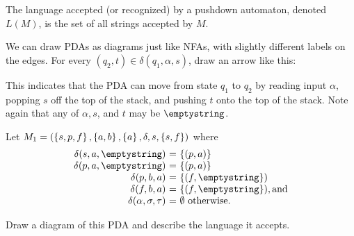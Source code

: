 \documentclass[twoside,letterpaper,openany]{book}
\begin{document}
\begin{defn}
The language accepted (or recognized) by a pushdown automaton, denoted $L(M)$, is the set of all strings accepted by $M$.

\end{defn}

\begin{discussion}
We can draw PDAs as diagrams just like NFAs, with slightly different labels on the edges. For every $(q_2, t) \in \delta(q_1, \alpha, s)$,   draw an arrow like this: 

\begin{center}
\end{center}

This indicates that the PDA can move from state $q_1$ to $q_2$ by reading input $\alpha$, popping $s$ off the top of the stack, and pushing $t$ onto the top of the stack. Note again that any of $\alpha, s$, and $t$ may be $\emptystring$.
\end{discussion}

\begin{exer}
Let $M_1 = (\left\lbrace s, p, f \right\rbrace, \left\lbrace a, b \right\rbrace, \left\lbrace a \right\rbrace, \delta, s, \left\lbrace s, f \right\rbrace)$ where 
\[\begin{array}{r@{\ =\ }l}
\delta(s, a, \emptystring)  &  \setdef{(p, a)}  \\
\delta(p, a, \emptystring) & \setdef{(p, a)} \\
\delta(p, b, a)  & \setdef{(f, \emptystring}) \\
\delta(f, b, a) & \setdef{(f, \emptystring}), \textrm{and} \\
\delta(\alpha, \sigma, \tau) & \emptyset \ \textrm{otherwise}.
\end{array}\]

Draw a diagram of this PDA and describe the language it accepts.
\end{exer}
\end{document}
